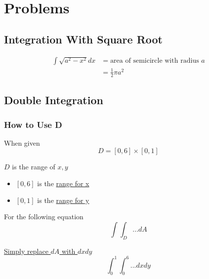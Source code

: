 \section{Problems}

  \subsection{Integration With Square Root}

    \begin{align*}
      \int \sqrt{a^{2} - x^{2}} dx &= \text{area of semicircle with radius } a \\
      &= \frac{1}{2} \pi a^{2}
    \end{align*}

  \subsection{Double Integration}

    \subsubsection{How to Use D}

      When given
      \begin{displaymath}
        D = \left[ 0, 6 \right] \times \left[ 0, 1 \right]
      \end{displaymath}

      $ D $ is the range of $ x, y $

      \begin{itemize}
        \item $ \left[ 0, 6 \right] $ is the \ul{range for x}
        \item $ \left[ 0, 1 \right] $ is the \ul{range for y}
      \end{itemize}

      For the following equation
      \begin{displaymath}
        \int \int_{D} ... dA
      \end{displaymath}

      \ul{Simply replace $ dA $ with $ dx dy $}
      \begin{displaymath}
        \int_{0}^{1} \int_{0}^{6} ... dx dy
      \end{displaymath}